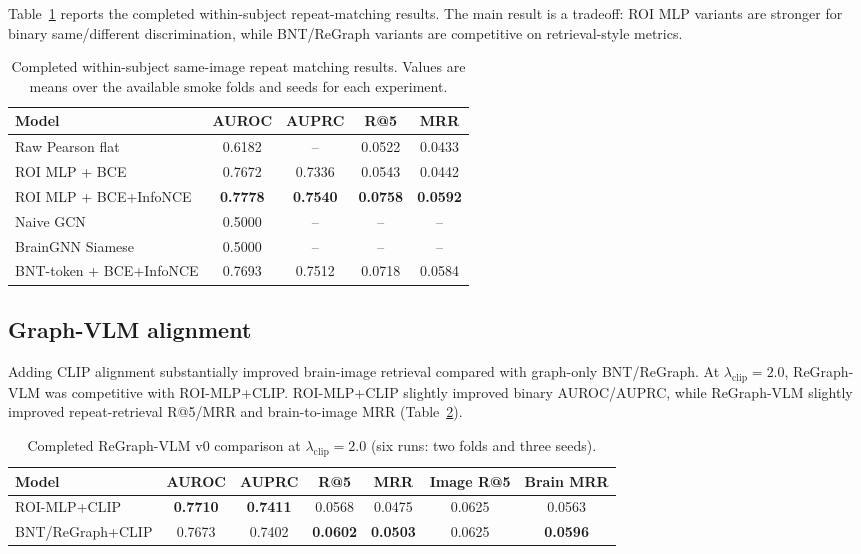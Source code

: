 \documentclass{article}
\begin{document}
Table~\ref{tab:within_subject} reports the completed within-subject repeat-matching results. The main result is a tradeoff: ROI MLP variants are stronger for binary same/different discrimination, while BNT/ReGraph variants are competitive on retrieval-style metrics.

\begin{table}[t]
  \centering
  \caption{Completed within-subject same-image repeat matching results. Values are means over the available smoke folds and seeds for each experiment.}
  \label{tab:within_subject}
  \small
  \begin{tabular}{lcccc}
    \toprule
    Model & AUROC & AUPRC & R@5 & MRR \\
    \midrule
    Raw Pearson flat & 0.6182 & -- & 0.0522 & 0.0433 \\
    ROI MLP + BCE & 0.7672 & 0.7336 & 0.0543 & 0.0442 \\
    ROI MLP + BCE+InfoNCE & \textbf{0.7778} & \textbf{0.7540} & \textbf{0.0758} & \textbf{0.0592} \\
    Naive GCN & 0.5000 & -- & -- & -- \\
    BrainGNN Siamese & 0.5000 & -- & -- & -- \\
    BNT-token + BCE+InfoNCE & 0.7693 & 0.7512 & 0.0718 & 0.0584 \\
    \bottomrule
  \end{tabular}
\end{table}

\subsection{Graph-VLM alignment}

Adding CLIP alignment substantially improved brain-image retrieval compared with graph-only BNT/ReGraph. At $\lambda_{\mathrm{clip}}=2.0$, ReGraph-VLM was competitive with ROI-MLP+CLIP. ROI-MLP+CLIP slightly improved binary AUROC/AUPRC, while ReGraph-VLM slightly improved repeat-retrieval R@5/MRR and brain-to-image MRR (Table~\ref{tab:vlm}).

\begin{table}[t]
  \centering
  \caption{Completed ReGraph-VLM v0 comparison at $\lambda_{\mathrm{clip}}=2.0$ (six runs: two folds and three seeds).}
  \label{tab:vlm}
  \small
  \begin{tabular}{lcccccc}
    \toprule
    Model & AUROC & AUPRC & R@5 & MRR & Image R@5 & Brain MRR \\
    \midrule
    ROI-MLP+CLIP & \textbf{0.7710} & \textbf{0.7411} & 0.0568 & 0.0475 & 0.0625 & 0.0563 \\
    BNT/ReGraph+CLIP & 0.7673 & 0.7402 & \textbf{0.0602} & \textbf{0.0503} & 0.0625 & \textbf{0.0596} \\
    \bottomrule
  \end{tabular}
\end{table}
\end{document}
